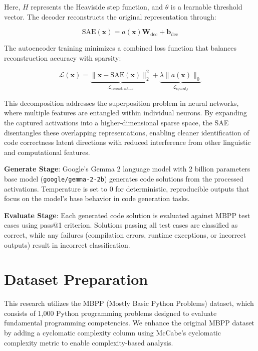 Here, $H$ represents the Heaviside step function, and $\theta$ is a learnable threshold vector. The decoder reconstructs the original representation through:

\begin{equation}
    \text{SAE}(\mathbf{x})=a(\mathbf{x})\mathbf{W}_{\text{dec}}+\mathbf{b}_{\text{dec}}
\end{equation}

The autoencoder training minimizes a combined loss function that balances reconstruction accuracy with sparsity:

\begin{equation}
    \mathcal{L}(\mathbf{x}) = \underbrace{\|\mathbf{x} - \text{SAE}(\mathbf{x})\|_2^2}_{\mathcal{L}_{\text{reconstruction}}} + \underbrace{\lambda \|a(\mathbf{x})\|_0}_{\mathcal{L}_{\text{sparsity}}}
\end{equation}

This decomposition addresses the superposition problem in neural networks, where multiple features are entangled within individual neurons. By expanding the captured activations into a higher-dimensional sparse space, the SAE disentangles these overlapping representations, enabling cleaner identification of code correctness latent directions with reduced interference from other linguistic and computational features.

\textbf{Generate Stage}: Google's Gemma 2 language model with 2 billion parameters base model (\texttt{google/gemma-2-2b}) \cite{team2024gemma} generates code solutions from the processed activations. Temperature is set to 0 for deterministic, reproducible outputs that focus on the model's base behavior in code generation tasks.

\textbf{Evaluate Stage}: Each generated code solution is evaluated against MBPP test cases using pass@1 criterion. Solutions passing all test cases are classified as correct, while any failures (compilation errors, runtime exceptions, or incorrect outputs) result in incorrect classification.

\section{Dataset Preparation}

This research utilizes the MBPP (Mostly Basic Python Problems) dataset, which consists of 1,000 Python programming problems designed to evaluate fundamental programming competencies. We enhance the original MBPP dataset by adding a cyclomatic complexity column using McCabe's cyclomatic complexity metric \cite{mccabe1976complexity} to enable complexity-based analysis.

